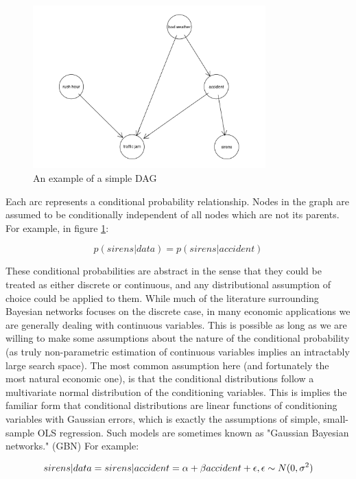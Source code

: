 \documentclass{article}
\begin{document}
\begin{figure}
  \centering
  \includegraphics[width=0.8\textwidth]{images/trafficjam.png}
  \caption{An example of a simple DAG \parencite{traffic_jam}}
  \label{dag1}
\end{figure}

Each arc represents a conditional probability relationship. Nodes in the graph are assumed to be conditionally independent of all nodes which are not its parents. For example, in figure \ref{dag1}: 

\begin{equation}
  \label{eq1}
  p(sirens | data) = p(sirens | accident)
\end{equation}

These conditional probabilities are abstract in the sense that they could be treated as either discrete or continuous, and any distributional assumption of choice could be applied to them. While much of the literature surrounding Bayesian networks focuses on the discrete case, in many economic applications we are generally dealing with continuous variables. This is possible as long as we are willing to make some assumptions about the nature of the conditional probability (as truly non-parametric estimation of continuous variables implies an intractably large search space). The most common assumption here (and fortunately the most natural economic one), is that the conditional distributions follow a multivariate normal distribution of the conditioning variables. This is implies the familiar form that conditional distributions are linear functions of conditioning variables with Gaussian errors, which is exactly the assumptions of simple, small-sample OLS regression. Such models are sometimes known as "Gaussian Bayesian networks." (GBN) For example:

\begin{equation}
  \label{eq2}
  sirens|data = sirens|accident = \alpha + \beta accident + \epsilon, \space \epsilon \sim N(0, \sigma^2)
\end{equation}
\end{document}
